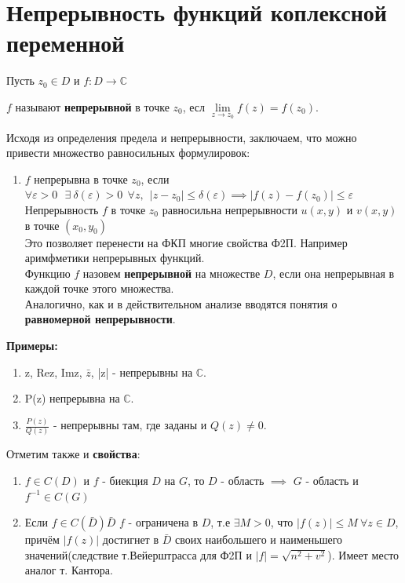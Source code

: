 \documentclass[a4paper, 12pt]{report}
\begin{document}
\section{Непрерывность функций коплексной переменной}
\par Пусть $z_0 \in D$ и $f:D \to \mathbb{C}$
\par $f$ называют \textbf{непрерывной} в точке $z_0$, есл $\lim\limits_{z\to z_0}f(z) = f(z_0)$.
\par Исходя из определения предела и непрерывности, заключаем, что можно привести множество равносильных формулировок:
\begin{enumerate}
\item $f$ непрерывна в точке $z_0$, если \\ $\forall \varepsilon > 0 \ \ \ \exists \ \delta(\varepsilon) > 0 \ \  \forall z,\ \ |z - z_0|\leq \delta(\varepsilon) \implies |f(z) - f(z_0)| \leq \varepsilon $
\\ Непрерывность $f$ в точке $z_0$ равносильна непрерывности $u(x,y)$ и $v(x,y)$ в точке $(x_0, y_0)$
\\ Это позволяет перенести на ФКП многие свойства Ф2П. Например аримфметики непрерывных функций. 
\\ Функцию $f$ назовем \textbf{непрерывной}  на множестве $D$, если она непрерывная в каждой точке этого множества. 
\\Аналогично, как и в действительном анализе вводятся понятия о \textbf{равномерной непрерывности}.
\end{enumerate}
\par\bigskip
\textbf{Примеры:}
\begin{enumerate}
    \item z, Rez, Imz, $\bar z$, |z| - непрерывны на $\mathbb{C}$.
    \item P(z) непрерывна на $\mathbb{C}$.
    \item $\frac{P(z)}{Q(z)}$ - непрерывны там, где заданы и $Q(z) \neq 0$.
\end{enumerate}

\par\bigskip
Отметим также и \textbf{свойства}:
\begin{enumerate}
    \item $f \in C(D)$ и $f$ - биекция $D$ на $G$, то $D$ - область $\implies$ $G$ - область и $f^{-1} \in C(G)$ 
\item Если $f \in C(\bar D) \bar D$ $f$ - ограничена в $D$, т.е $\exists M > 0$, что $|f(z)|\leq M \ \forall z \in D$, причём $|f(z)|$ достигнет в $\bar D$ своих наибольшего и наименьшего значений(следствие т.Вейерштрасса для Ф2П и $|f| = \sqrt{n^2 + v^2}$). Имеет место аналог т. Кантора.
\end{enumerate}
\end{document}

